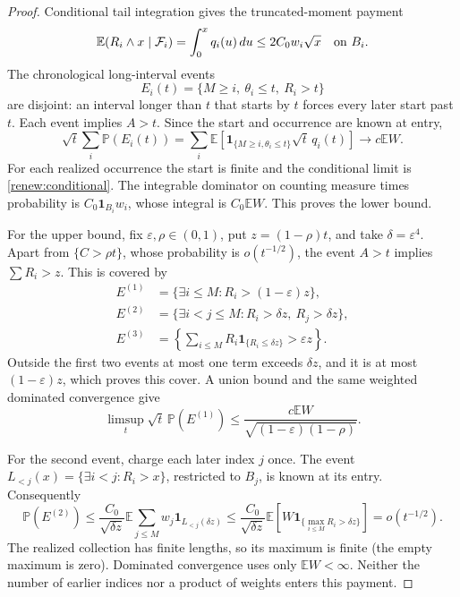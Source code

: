 \documentclass[11pt]{amsart}
\theoremstyle{definition}
\theoremstyle{remark}
\newcommand{\E}{\mathbb E}
\newcommand{\PP}{\mathbb P}
\newcommand{\one}{\mathbf 1}
\begin{document}
\begin{proof}
Conditional tail integration gives the truncated-moment payment
\begin{equation}\label{renew:truncation}
 \E(R_i\wedge x\mid\mathcal F_i)
       =\int_0^xq_i(u)\,du\le2C_0w_i\sqrt x
                 \quad\hbox{on }B_i.
\end{equation}
The chronological long-interval events
\begin{equation}\label{renew:events}
 E_i(t)=\{M\ge i,\ \theta_i\le t,\ R_i>t\}
\end{equation}
are disjoint: an interval longer than $t$ that starts by $t$ forces every
later start past $t$. Each event implies $A>t$. Since the start and
occurrence are known at entry,
\[
 \sqrt t\sum_i\PP(E_i(t))=
 \sum_i\E[\one_{\{M\ge i,\theta_i\le t\}}\sqrt t\,q_i(t)]
              \longrightarrow c\E W.
\]
For each realized occurrence the start is finite and the conditional
limit is \eqref{renew:conditional}. The integrable dominator on counting
measure times probability is $C_0\one_{B_i}w_i$, whose integral is
$C_0\E W$. This proves the lower bound.

For the upper bound, fix $\varepsilon,\rho\in(0,1)$, put
$z=(1-\rho)t$, and take $\delta=\varepsilon^4$. Apart from
$\{C>\rho t\}$, whose probability is $o(t^{-1/2})$, the event $A>t$
implies $\sum R_i>z$. This is covered by
\begin{align*}
 E^{(1)}&=\{\exists i\le M:R_i>(1-\varepsilon)z\},\\
 E^{(2)}&=\{\exists i<j\le M:R_i>\delta z,\ R_j>\delta z\},\\
 E^{(3)}&=\left\{\sum_{i\le M}R_i\one_{\{R_i\le\delta z\}}
                                              >\varepsilon z\right\}.
\end{align*}
Outside the first two events at most one term exceeds $\delta z$, and
it is at most $(1-\varepsilon)z$, which proves this cover.
A union bound and the same weighted dominated convergence give
\begin{equation}\label{eq:assembly-large}
 \limsup_t\sqrt t\,\PP(E^{(1)})
 \le\frac{c\E W}{\sqrt{(1-\varepsilon)(1-\rho)}}.
\end{equation}

For the second event, charge each later index $j$ once. The event
$L_{<j}(x)=\{\exists i<j:R_i>x\}$, restricted to $B_j$, is known at
its entry. Consequently
\begin{equation}\label{renew:one-charge}
 \PP(E^{(2)})\le\frac{C_0}{\sqrt{\delta z}}
    \E\sum_{j\le M}w_j\one_{L_{<j}(\delta z)}
 \le\frac{C_0}{\sqrt{\delta z}}
    \E[W\one_{\{\max_{i\le M}R_i>\delta z\}}]
                         =o(t^{-1/2}).
\end{equation}
The realized collection has finite lengths, so its maximum is finite
(the empty maximum is zero). Dominated convergence uses only
$\E W<\infty$. Neither the number of earlier indices nor a product of
weights enters this payment.


\end{proof}
\end{document}
